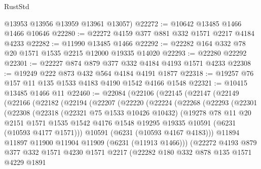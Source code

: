 \begin{lexlean}{RustStd}
\begin{coremodule}
{{      @13953
      @13956
      @13959
      @13961
      @13057)
@22272 := @10642 @13485 @1466 @1466 @10646
@22280 := @22272 @4159 @377 @881 @332 @1571 @2217 @4184 @4233
@22282 := @11990 @13485 @1466
@22292 := @22282 @164 @332 @78 @20 @1571 @1535 @2215 @12000 @19335 @14020
@22293 := @22280 @22292
@22301 := @22227 @874 @879 @377 @332 @4184 @4193 @1571 @4233
@22308 := @19249 @222 @873 @432 @564 @4184 @4191 @1877
@22318 := @19257 @76 @157 @11 @135 @1533 @4183 @4190 @1542 @4166 @1548
@22321 := @10415 @13485 @1466 @11
@22460 := @22084
    (@22106
      (@22145
        (@22147
          (@22149
            (@22166
              (@22182
                (@22194
                  (@22207
                    (@22220
                      (@22224
                        (@22268
                          (@22293
                            (@22301
                              (@22308
                                (@22318
                                  (@22321 @75 @1533 @10426 @10432)
                                  (@19278
                                    @78
                                    @11
                                    @20
                                    @2151
                                    @1571
                                    @1535
                                    @1542
                                    @4176
                                    @1548
                                    @19295
                                    @19335
                                    @10591
                                    (@6231 (@10593 @4177 @1571)))
                                  @10591
                                  (@6231 (@10593 @4167 @4183)))
                                @11894
                                @11897
                                @11900
                                @11904
                                @11909
                                (@6231 (@11913 @1466)))
                              (@22272
                                @4193
                                @879
                                @377
                                @332
                                @1571
                                @4230
                                @1571
                                @2217
                                (@22282
                                  @180
                                  @332
                                  @878
                                  @135
                                  @1571
                                  @4229
                                  @1891
}}
\end{coremodule}
\end{lexlean}
